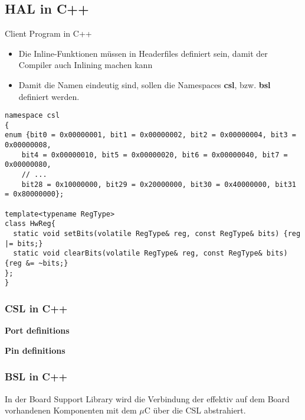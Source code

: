 \subsection{HAL in C++}
Client Program in C++

\begin{itemize}
  \item Die Inline-Funktionen müssen in Headerfiles definiert sein, damit der Compiler auch Inlining machen kann
  \item Damit die Namen eindeutig sind, sollen die Namespaces \textbf{csl}, bzw. \textbf{bsl} definiert werden.
\end{itemize}
\begin{lstlisting}[style=Cpp]
namespace csl
{
enum {bit0 = 0x00000001, bit1 = 0x00000002, bit2 = 0x00000004, bit3 = 0x00000008,
    bit4 = 0x00000010, bit5 = 0x00000020, bit6 = 0x00000040, bit7 = 0x00000080,
    // ...
    bit28 = 0x10000000, bit29 = 0x20000000, bit30 = 0x40000000, bit31 = 0x80000000};

template<typename RegType>
class HwReg{
  static void setBits(volatile RegType& reg, const RegType& bits) {reg |= bits;}
  static void clearBits(volatile RegType& reg, const RegType& bits) {reg &= ~bits;}
};
}
\end{lstlisting}

\subsubsection{CSL in C++}
\textbf{Port definitions}

\textbf{Pin definitions}


\subsubsection{BSL in C++}
In der Board Support Library wird die Verbindung der effektiv auf dem Board vorhandenen Komponenten mit dem $\mu$C über die CSL abstrahiert.

